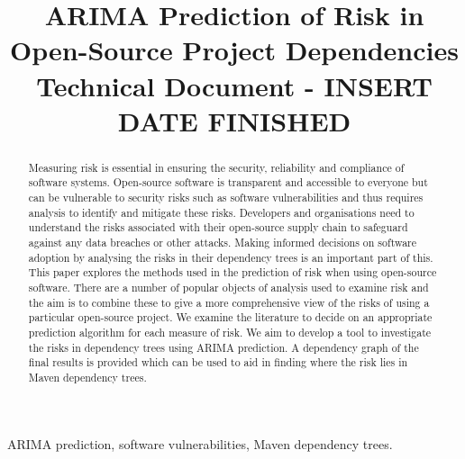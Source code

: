 \documentclass[conference]{IEEEtran}
\begin{document}
\title{ARIMA Prediction of Risk in \\Open-Source Project Dependencies\\
{\footnotesize Technical Document - INSERT DATE FINISHED}
}

\author{
\and
{}
    }

\maketitle
\thispagestyle{plain}
\pagestyle{plain}

\begin{abstract}
Measuring risk is essential in ensuring the security, reliability and compliance of software systems. Open-source software is transparent and accessible to everyone but can be vulnerable to security risks such as software vulnerabilities and thus requires analysis to identify and mitigate these risks. Developers and organisations need to understand the risks associated with their open-source supply chain to safeguard against any data breaches or other attacks. Making informed decisions on software adoption by analysing the risks in their dependency trees is an important part of this. This paper explores the methods used in the prediction of risk when using open-source software. There are a number of popular objects of analysis used to examine risk and the aim is to combine these to give a more comprehensive view of the risks of using a particular open-source project. We examine the literature to decide on an appropriate prediction algorithm for each measure of risk. We aim to develop a tool to investigate the risks in dependency trees using ARIMA prediction. A dependency graph of the final results is provided which can be used to aid in finding where the risk lies in Maven dependency trees. 
\end{abstract}

\begin{IEEEkeywords}
ARIMA prediction, software vulnerabilities, Maven dependency trees.
\end{IEEEkeywords}
\end{document}
